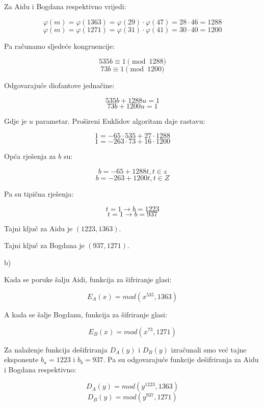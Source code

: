 \documentclass[12pt]{article}
\begin{document}
Za Aidu i Bogdana respektivno vrijedi:

$$\varphi(m) = \varphi(1363) = \varphi(29) \cdot \varphi(47) = 28 \cdot 46 = 1288$$
$$\varphi(m) = \varphi(1271) = \varphi(31) \cdot \varphi(41) = 30 \cdot 40 = 1200$$\vspace{1mm}

Pa računamo sljedeće kongruencije:

$$535b \equiv 1 \pmod{1288}$$
$$73b \equiv 1 \pmod{1200}$$\vspace{1mm}

Odgovarajuće diofantove jednačine:

$$535b + 1288u = 1$$
$$73b + 1200u = 1$$\vspace{1mm}

Gdje je $u$ parametar. Prošireni Euklidov algoritam daje rastavu:

$$1 = -65 \cdot 535 + 27 \cdot 1288$$
$$1 = -263 \cdot 73 + 16 \cdot 1200$$\vspace{1mm}

Opća rješenja za $b$ su:

$$b = -65 + 1288t, t \in z$$
$$b = -263 + 1200t, t \in Z$$\vspace{1mm}

Pa su tipična rješenja:

$$t = 1 \to b = 1223$$
$$t = 1 \to b = 937$$\vspace{1mm}

Tajni ključ za Aidu je $(1223, 1363)$.

Tajni ključ za Bogdana je $(937, 1271)$.\vspace{1mm}

b)\vspace{1mm}

Kada se poruke šalju Aidi, funkcija za šifriranje glasi:

$$E_{A}(x) = mod(x^{535}, 1363)$$\vspace{1mm}

A kada se šalje Bogdanu, funkcija za šifriranje glasi:

$$E_{B}(x) = mod(x^{73}, 1271)$$\vspace{1mm}

Za nalaženje funkcija dešifriranja $D_{A}(y)$ i $D_{B}(y)$ izračunali smo već tajne eksponente $b_{a} = 1223$ i $b_{b} = 937$. Pa su odgovarajuće funkcije dešifriranja za Aidu i Bogdana respektivno:

$$D_{A}(y) = mod(y^{1223}, 1363)$$
$$D_{B}(y) = mod(y^{937}, 1271)$$\vspace{1mm}
\end{document}

